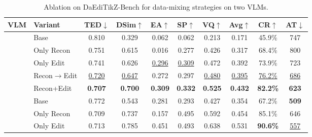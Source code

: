 \begin{table}[t]
\centering
\tiny
\setlength{\tabcolsep}{1.2pt}
\renewcommand{\arraystretch}{0.92}

\begin{minipage}[t]{0.53\textwidth}
\centering
\caption{Ablation on DaEdiTikZ-Bench for data-mixing strategies on two VLMs.}
\label{tab:editikz_ablation_data_mixture_new}

\begin{tabular}{clccccc:c:cc}
\toprule
\textbf{VLM} &
\textbf{Variant} &
\textbf{TED}$\downarrow$ &
\textbf{DSim}$\uparrow$ &
\textbf{EA}$\uparrow$ &
\textbf{SP}$\uparrow$ &
\textbf{VQ}$\uparrow$ &
\textbf{Avg}$\uparrow$ &
\textbf{CR}$\uparrow$ &
\textbf{AT}$\downarrow$ \\
\midrule

& Base
& 0.810 & 0.329 & 0.062 & 0.062 & 0.213
& 0.171
& 45.9\% & 747 \\

& Only Recon
& 0.751 & 0.615 & 0.016 & 0.277 & 0.426
& 0.317
& 68.4\% & 800 \\

& Only Edit
& 0.741 & 0.626 & \underline{0.296} & \underline{0.309}
& 0.472
& 0.392
& 73.9\% & 723 \\

& Recon$\rightarrow$Edit
& \underline{0.720} & \underline{0.647} & 0.272 & 0.297
& \underline{0.480}
& \underline{0.395}
& \underline{76.2\%} & \underline{686} \\

& Recon+Edit
& \textbf{0.707} & \textbf{0.700} & \textbf{0.309} & \textbf{0.332}
& \textbf{0.525}
& \textbf{0.432}
& \textbf{82.2\%} & \textbf{623} \\

\midrule

& Base
& 0.772 & 0.543 & 0.281 & 0.293 & 0.427
& 0.354
& 67.2\% & \textbf{509} \\

& Only Recon
& 0.709 & 0.737 & 0.157 & 0.495 & 0.592
& 0.454
& 85.1\% & 646 \\

& Only Edit
& 0.713 & 0.785 & 0.451 & 0.493 & 0.638
& 0.531
& \textbf{90.6\%} & \underline{557} \\


\end{tabular}
\end{minipage}
\end{table}
